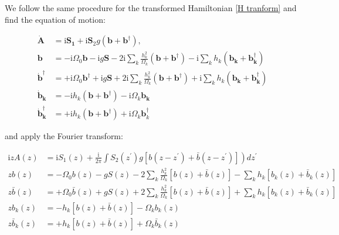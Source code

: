 \documentclass[%
preprint,
onecolumn,
notitlepag,
 amsmath,amssymb,
 aps,
 pra,
]{revtex4-2}
\begin{document}
\begin{itemize}
We follow the same procedure for the transformed Hamiltonian \eqref{H tranform} and find the equation of motion:  



\begin{equation}
\begin{aligned}
\boldsymbol{ \dot{A} }&=\mathrm{i} \boldsymbol{ S_{1}}+\mathrm{i} \boldsymbol{S}_{2} g\left(\boldsymbol{b}+\boldsymbol{b}^{\dagger}\right), \\
\boldsymbol{b} &=-\mathrm{i} \Omega_{0} \boldsymbol{b}-\mathrm{i} g \boldsymbol{S}-2 \mathrm{i} \sum_{k} \frac{h_{k}^{2}}{\Omega_{k}}\left(\boldsymbol{b}+\boldsymbol{b}^{\dagger}\right)-\mathrm{i} \sum_{k} h_{k}\left(\boldsymbol{b}_{\boldsymbol{k}}+\boldsymbol{b}_{\boldsymbol{k}}^{\dagger}\right) \\
\dot{\boldsymbol{b}}^{\dagger} &=+\mathrm{i} \Omega_{0} \boldsymbol{b}^{\dagger}+\mathrm{i} g \boldsymbol{S}+2 \mathrm{i} \sum_{k} \frac{h_{k}^{2}}{\Omega_{k}}\left(\boldsymbol{b}+\boldsymbol{b}^{\dagger}\right)+\mathrm{i} \sum_{k} h_{k}\left(\boldsymbol{b}_{\boldsymbol{k}}+\boldsymbol{b}_{\boldsymbol{k}}^{\dagger}\right) \\
\dot{\boldsymbol{b}}_{\boldsymbol{k}} &=-\mathrm{i} h_{k}\left(\boldsymbol{b}+\boldsymbol{b}^{\dagger}\right)-\mathrm{i} \Omega_{k} \boldsymbol{b}_{\boldsymbol{k}} \\
\dot{\boldsymbol{b}}_{\boldsymbol{k}}^{\dagger} &=+\mathrm{i} h_{k}\left(\boldsymbol{b}+\boldsymbol{b}^{\dagger}\right)+\mathrm{i} \Omega_{k} \boldsymbol{b}_{k}^{\dagger}
\end{aligned}
\end{equation}

and apply the Fourier transform: 

\begin{equation}
\begin{aligned}
 \mathrm{i} z A(z) &\left.= \mathrm{i} S_{1}(z)+\frac{\mathrm{i} }{2 \pi} \int S_{2}\left(z^{\prime}\right) g\left[b\left(z-z^{\prime}\right)+\bar{b}\left(z-z^{\prime}\right)\right]\right) d z^{\prime} \\
z b(z) &=-\Omega_{0} b(z)-g S(z)-2 \sum_{k} \frac{h_{k}^{2}}{\Omega_{k}}[b(z)+\bar{b}(z)]-\sum_{k} h_{k}\left[b_{k}(z)+\bar{b}_{k}(z)\right] \\
z \bar{b}(z) &=+\Omega_{0} \bar{b}(z)+g S(z)+2 \sum_{k} \frac{h_{k}^{2}}{\Omega_{k}}[b(z)+\bar{b}(z)]+\sum_{k} h_{k}\left[b_{k}(z)+\bar{b}_{k}(z)\right] \\
z b_{k}(z) &=-h_{k}[b(z)+\bar{b}(z)]-\Omega_{k} b_{k}(z) \\
z \bar{b}_{k}(z) &=+h_{k}[b(z)+\bar{b}(z)]+\Omega_{k} \bar{b}_{k}(z)
\end{aligned}
\end{equation}


\end{itemize}
\end{document}
